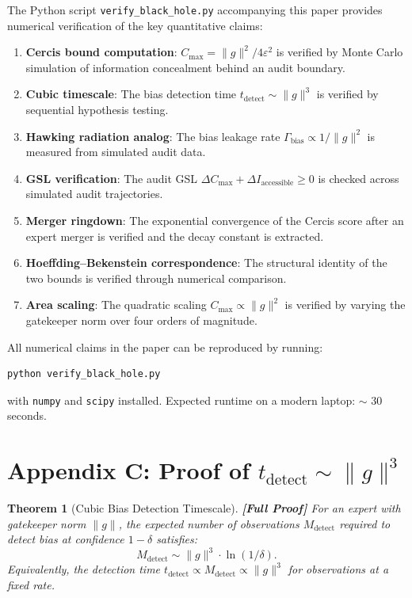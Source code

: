 \documentclass[12pt,a4paper]{article}
\newtheorem{theorem}{Theorem}[section]
\theoremstyle{remark}
\newcommand{\Cercis}{\textsf{Cercis}}
\newcommand{\rigorFull}{\textbf{[Full Proof]}}
\begin{document}
The Python script \texttt{verify\_black\_hole.py} accompanying this paper provides numerical verification of the key quantitative claims:

\begin{enumerate}[leftmargin=*, label=(\arabic*)]
  \item \textbf{Cercis bound computation}: $C_{\max} = \|g\|^2 / 4\varepsilon^2$ is verified by Monte Carlo simulation of information concealment behind an audit boundary.
  \item \textbf{Cubic timescale}: The bias detection time $t_{\text{detect}} \sim \|g\|^3$ is verified by sequential hypothesis testing.
  \item \textbf{Hawking radiation analog}: The bias leakage rate $\Gamma_{\text{bias}} \propto 1/\|g\|^2$ is measured from simulated audit data.
  \item \textbf{GSL verification}: The audit GSL $\Delta C_{\max} + \Delta I_{\text{accessible}} \geq 0$ is checked across simulated audit trajectories.
  \item \textbf{Merger ringdown}: The exponential convergence of the \Cercis{} score after an expert merger is verified and the decay constant is extracted.
  \item \textbf{Hoeffding--Bekenstein correspondence}: The structural identity of the two bounds is verified through numerical comparison.
  \item \textbf{Area scaling}: The quadratic scaling $C_{\max} \propto \|g\|^2$ is verified by varying the gatekeeper norm over four orders of magnitude.
\end{enumerate}

All numerical claims in the paper can be reproduced by running:
\begin{verbatim}
python verify_black_hole.py
\end{verbatim}
with \texttt{numpy} and \texttt{scipy} installed. Expected runtime on a modern laptop: $\sim$ 30 seconds.


\section*{Appendix C: Proof of $t_{\text{detect}} \sim \|g\|^3$}
\label{app:cubic}

\begin{theorem}[Cubic Bias Detection Timescale]
\label{thm:cubic_detection}
\rigorFull
For an expert with gatekeeper norm $\|g\|$, the expected number of observations $M_{\text{detect}}$ required to detect bias at confidence $1-\delta$ satisfies:
\begin{equation}
  M_{\text{detect}} \sim \|g\|^3 \cdot \ln(1/\delta).
\end{equation}
Equivalently, the detection time $t_{\text{detect}} \propto M_{\text{detect}} \propto \|g\|^3$ for observations at a fixed rate.
\end{theorem}
\end{document}
